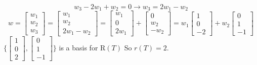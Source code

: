 \documentclass[12pt]{article}
\begin{document}
\begin{example}
$$w_3 - 2w_1 + w_2 = 0 \rightarrow w_3 = 2w_1 - w_2 $$ $$w = \begin{bmatrix} w_1 \\ w_2 \\ w_3 \end{bmatrix} = \begin{bmatrix} w_1 \\ w_2 \\ 2w_1 - w_2 \end{bmatrix} = \begin{bmatrix} w_1 \\ 0 \\ 2w_1 \end{bmatrix} + \begin{bmatrix} 0 \\ w_2 \\ -w_2 \end{bmatrix}= w_1 \begin{bmatrix} 1 \\ 0 \\ -2 \end{bmatrix} + w_2 \begin{bmatrix} 0 \\ 1 \\ -1 \end{bmatrix} $$ $\{\begin{bmatrix} 1 \\ 0 \\ 2 \end{bmatrix}, \begin{bmatrix} 0 \\ 1 \\ -1 \end{bmatrix}\}$ is a basis for $\mathrm{R}(T)$ So $r(T) = 2$. \newline 

\end{example}
\end{document}
